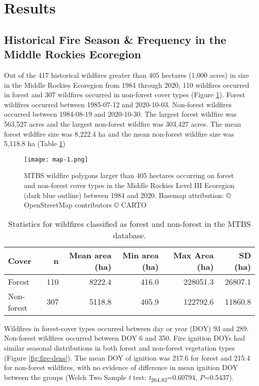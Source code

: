 \documentclass[11p]{article}
\begin{document}
\section{Results}

\subsection{Historical Fire Season \& Frequency in the Middle Rockies Ecoregion}

Out of the 417 historical wildfires greater than 405 hectares (1,000 acres) in size in the Middle Rockies Ecoregion from 1984 through 2020, 110 wildfires occurred in forest and 307 wildfires occurred in non-forest cover types (Figure \ref{fig:map}). Forest wildfires occurred between 1985-07-12 and 2020-10-03. Non-forest wildfires occurred between 1984-08-19 and 2020-10-30. The largest forest wildfire was 563,527 acres and the largest non-forest wildfire was 303,427 acres. The mean forest wildfire size was 8,222.4 ha and the mean non-forest wildfire size was 5,118.8 ha (Table \ref{tab:mtbs-stats})

\begin{figure}[htbp]
  \texttt{[image: map-1.png]}
  \caption{MTBS wildfire polygons larger than 405 hectares occurring on forest and non-forest cover types in the Middle Rockies Level III Ecoregion (dark blue outline) between 1984 and 2020. Basemap attribution: © OpenStreetMap contributors © CARTO}
  \label{fig:map}
\end{figure}

\begin{table}
  \centering
  \begin{tabular}{lrrrrr}
    \hline
    Cover      & n   & Mean area (ha) & Min area (ha) & Max Area (ha) & SD (ha) \\
    \hline
    Forest     & 110 & 8222.4         & 416.0         & 228051.3      & 26807.1 \\
    Non-forest & 307 & 5118.8         & 405.9         & 122792.6      & 11860.8  \\
  \end{tabular}
  \caption{Statistics for wildfires classified as forest and non-forest in the MTBS database.}
  \label{tab:mtbs-stats}
\end{table}

Wildfires in forest-cover types occurred between day or year (DOY) 93 and 289. Non-forest wildfires occurred between DOY 6 and 350. Fire ignition DOYs had similar seasonal distributions in both forest and non-forest vegetation types (Figure \ref{fig:fire-dens}). The mean DOY of ignition was 217.6 for forest and 215.4 for non-forest wildfires, with no evidence of difference in mean ignition DOY between the groups (Welch Two Sample \textit{t} test: \textit{t}\textsubscript{264.83}=0.60794, \textit{P}=0.5437).
\end{document}
